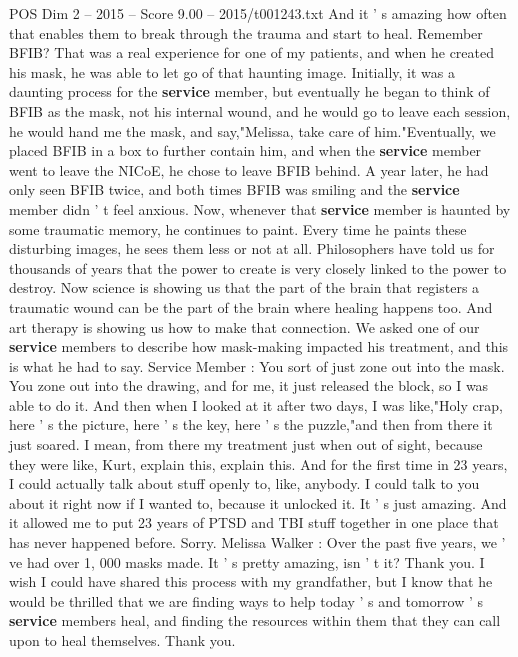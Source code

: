\begin{textsample}{POS Dim 2 – 2015 – Score 9.00 – 2015/t001243.txt}
And it ' s amazing how often that enables them to break through the trauma and start to heal.
Remember BFIB?
That was a real experience for one of my patients, and when he created his mask, he was able to let go of that haunting image.
Initially, it was a daunting process for the \textbf{service} member, but eventually he began to think of BFIB as the mask, not his internal wound, and he would go to leave each session, he would hand me the mask, and say,"Melissa, take care of him."Eventually, we placed BFIB in a box to further contain him, and when the \textbf{service} member went to leave the NICoE, he chose to leave BFIB behind.
A year later, he had only seen BFIB twice, and both times BFIB was smiling and the \textbf{service} member didn ' t feel anxious.
Now, whenever that \textbf{service} member is haunted by some traumatic memory, he continues to paint.
Every time he paints these disturbing images, he sees them less or not at all.
Philosophers have told us for thousands of years that the power to create is very closely linked to the power to destroy.
Now science is showing us that the part of the brain that registers a traumatic wound can be the part of the brain where healing happens too.
And art therapy is showing us how to make that connection.
We asked one of our \textbf{service} members to describe how mask-making impacted his treatment, and this is what he had to say.
Service Member : You sort of just zone out into the mask.
You zone out into the drawing, and for me, it just released the block, so I was able to do it.
And then when I looked at it after two days, I was like,"Holy crap, here ' s the picture, here ' s the key, here ' s the puzzle,"and then from there it just soared.
I mean, from there my treatment just when out of sight, because they were like, Kurt, explain this, explain this.
And for the first time in 23 years, I could actually talk about stuff openly to, like, anybody.
I could talk to you about it right now if I wanted to, because it unlocked it.
It ' s just amazing.
And it allowed me to put 23 years of PTSD and TBI stuff together in one place that has never happened before.
Sorry.
Melissa Walker : Over the past five years, we ' ve had over 1, 000 masks made.
It ' s pretty amazing, isn ' t it?
Thank you.
I wish I could have shared this process with my grandfather, but I know that he would be thrilled that we are finding ways to help today ' s and tomorrow ' s \textbf{service} members heal, and finding the resources within them that they can call upon to heal themselves.
Thank you.

\end{textsample}
